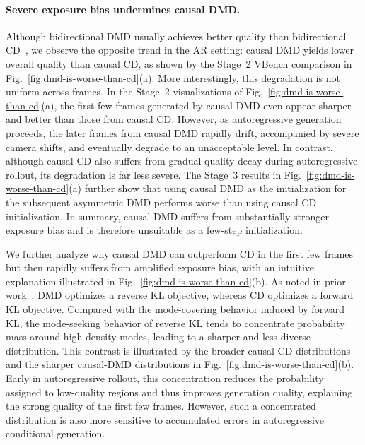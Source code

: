 \paragraph{Severe exposure bias undermines causal DMD.}
Although bidirectional DMD usually achieves better quality than bidirectional CD~\cite{yin2024one,yin2024improved,zheng2025large}, we observe the opposite trend in the AR setting: causal DMD yields lower overall quality than causal CD, as shown by the Stage~2 VBench comparison in Fig.~\ref{fig:dmd-is-worse-than-cd}(a). More interestingly, this degradation is not uniform across frames. In the Stage~2 visualizations of Fig.~\ref{fig:dmd-is-worse-than-cd}(a), the first few frames generated by causal DMD even appear sharper and better than those from causal CD. However, as autoregressive generation proceeds, the later frames from causal DMD rapidly drift, accompanied by severe camera shifts, and eventually degrade to an unacceptable level. In contrast, although causal CD also suffers from gradual quality decay during autoregressive rollout, its degradation is far less severe. The Stage~3 results in Fig.~\ref{fig:dmd-is-worse-than-cd}(a) further show that using causal DMD as the initialization for the subsequent asymmetric DMD performs worse than using causal CD initialization. In summary, causal DMD suffers from substantially stronger exposure bias and is therefore unsuitable as a few-step initialization.

We further analyze why causal DMD can outperform CD in the first few frames but then rapidly suffers from amplified exposure bias, with an intuitive explanation illustrated in Fig.~\ref{fig:dmd-is-worse-than-cd}(b). As noted in prior work~\cite{zheng2025large}, DMD optimizes a reverse KL objective, whereas CD optimizes a forward KL objective. Compared with the mode-covering behavior induced by forward KL, the mode-seeking behavior of reverse KL tends to concentrate probability mass around high-density modes, leading to a sharper and less diverse distribution. This contrast is illustrated by the broader causal-CD distributions and the sharper causal-DMD distributions in Fig.~\ref{fig:dmd-is-worse-than-cd}(b). Early in autoregressive rollout, this concentration reduces the probability assigned to low-quality regions and thus improves generation quality, explaining the strong quality of the first few frames. However, such a concentrated distribution is also more sensitive to accumulated errors in autoregressive conditional generation.

